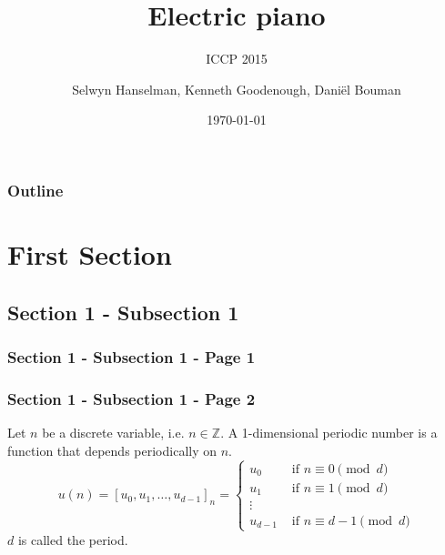 \documentclass{beamer}
\title[Electric piano]{Electric piano}
\subtitle{\normalsize{ICCP 2015}}
\institute[TU Delft]{Delft University of Technology}
\author{Selwyn Hanselman, Kenneth Goodenough, Dani\"{e}l Bouman}
\date{\today}
\newcommand*\titleTOC{Outline}
\newcommand{\field}[1]{\mathbb{#1}}
\newcommand{\Zset}{\field{Z}}
\begin{document}
{
%
\frame{\titlepage}
}

{
\begin{frame}\frametitle{\titleTOC}
	\tableofcontents
\end{frame}
}

\section{First Section}
\subsection{Section 1 - Subsection 1}

\begin{frame}\frametitle{Section 1 - Subsection 1 - Page 1}
	
\end{frame}

\begin{frame}\frametitle{Section 1 - Subsection 1 - Page 2}
	\begin{definition}
		Let $n$ be a discrete variable, i.e. $n\in\Zset$.
		A 1-dimensional periodic number is a function that depends periodically on $n$.
		$$
		u(n)=
		[u_0,u_1,\ldots,u_{d-1}]_n=
		\begin{cases}
			u_0 & \mbox{ if $n\equiv 0 \pmod d$} \\
			u_1 & \mbox{ if $n\equiv 1 \pmod d$} \\
			\vdots \\
			u_{d-1} & \mbox{ if $n\equiv d-1 \pmod d$}
		\end{cases}
		$$
		$d$ is called the period.
	\end{definition}
\end{frame}
\end{document}

